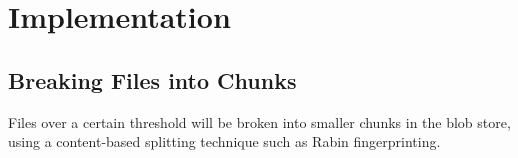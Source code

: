 \chapter{Implementation}

\section{Breaking Files into Chunks}

Files over a certain threshold will be broken into smaller chunks in the blob
store, using a content-based splitting technique such as Rabin fingerprinting.
